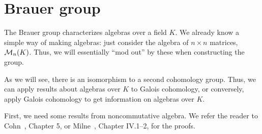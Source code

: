 \section{Brauer group}
The Brauer group characterizes algebras over a field $K$. We already know a simple way of making algebras: just consider the algebra of $n\times n$ matrices, $\cal M_n(K)$. Thus, we will essentially ``mod out'' by these when constructing the group.

As we will see, there is an isomorphism to a second cohomology group. Thus, we can apply results about algebras over $K$ to Galois cohomology, or conversely, apply Galois cohomology to get information on algebras over $K$.

First, we need some results from noncommutative algebra. We refer the reader to Cohn~\cite{Co03}, Chapter 5, or Milne~\cite{Mi08}, Chapter IV.1--2, for the proofs. %

